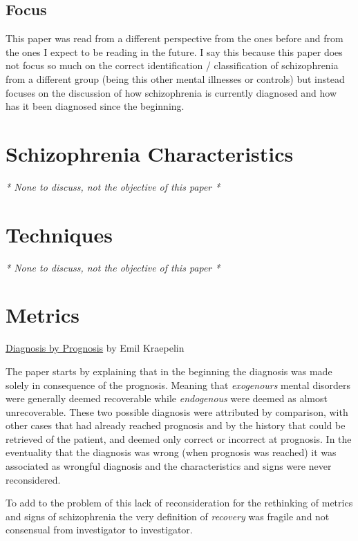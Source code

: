 \documentclass{Paper_Summary}
\begin{document}
\makepapertitle

\breakline

\begin{center}
    \section*{Focus}
\end{center}
    This paper was read from a different perspective from the ones before and from the ones I expect to be reading in the future. I say this because this paper does not focus so much on the correct identification / classification of schizophrenia from a different group (being this other mental illnesses or controls) but instead focuses on the discussion of how schizophrenia is currently diagnosed and how has it been diagnosed since the beginning.

\breakline

\newpage

\section{Schizophrenia Characteristics}
\emph{* None to discuss, not the objective of this paper *}

\section{Techniques}
\emph{* None to discuss, not the objective of this paper *}

\section{Metrics}

\underline{Diagnosis by Prognosis} by Emil Kraepelin

    The paper starts by explaining that in the beginning the diagnosis was made solely in consequence of the prognosis. Meaning that \emph{exogenours} mental disorders were generally deemed recoverable while \emph{endogenous} were deemed as almost unrecoverable.
    These two possible diagnosis were attributed by comparison, with other cases that had already reached prognosis and by the history that could be retrieved of the patient, and deemed only correct or incorrect at prognosis. In the eventuality that the diagnosis was wrong (when prognosis was reached) it was associated as wrongful diagnosis and the characteristics and signs were never reconsidered.

    To add to the problem of this lack of reconsideration for the rethinking of metrics and signs of schizophrenia the very definition of \emph{recovery} was fragile and not consensual from investigator to investigator.
\end{document}
